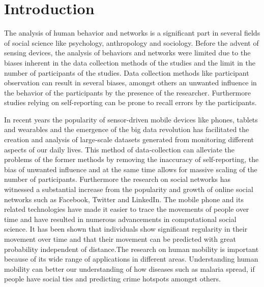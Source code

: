 \chapter{Introduction}
\label{chap:Introduction}

The analysis of human behavior and networks is a significant part in several fields of social science like psychology, anthropology and sociology. Before the advent of sensing devices, the analysis of behaviors and networks were limited due to the biases inherent in the data collection methods of the studies and the limit in the number of participants of the studies. Data collection methods like participant observation can result in several biases, amongst others an unwanted influence in the behavior of the participants by the presence of the researcher\cite{rosenthal1966experimenter}. Furthermore studies relying on self-reporting can be prone to recall errors by the participants\cite{stone1999science}\cite{bernard1980informant}.

In recent years the popularity of sensor-driven mobile devices like phones, tablets and wearables and the emergence of the big data revolution has facilitated the creation and analysis of large-scale datasets generated from monitoring different aspects of our daily lives\cite{lazer2009life}. This method of data-collection can alleviate the problems of the former methods by removing the inaccuracy of self-reporting, the bias of unwanted influence and at the same time allows for massive scaling of the number of participants. Furthermore the research on social networks has witnessed a substantial increase from the popularity and growth of online social networks such as Facebook, Twitter and LinkedIn\cite{social_networks}. The mobile phone and its related technologies have made it easier to trace the movements of people over time and have resulted in numerous advancements in computational social science. It has been shown that individuals show significant regularity in their movement over time\cite{gonzalez2008understanding} and that their movement can be predicted with great probability independent of distance\cite{song2010limits}.The research on human mobility is important because of its wide range of applications in different areas. Understanding human mobility can better our understanding of how diseases such as malaria spread\cite{wesolowski2012quantifying}, if people have social ties\cite{crandall2010inferring} and predicting crime hotspots\cite{bogomolov2014once} amongst others.


